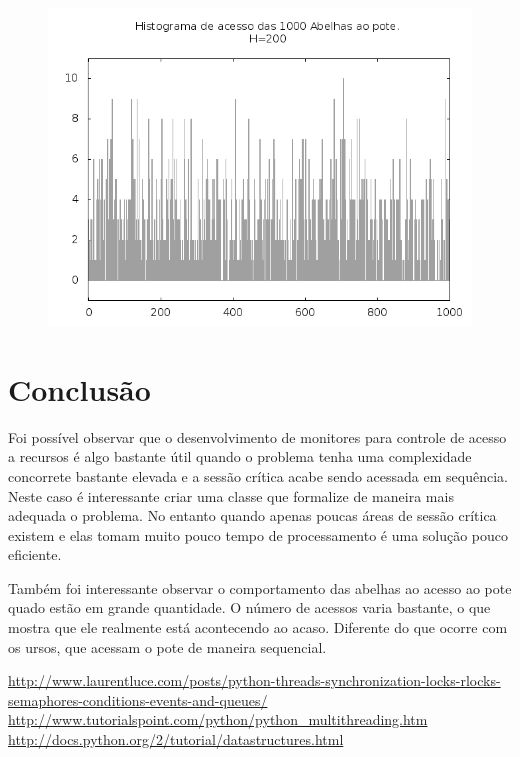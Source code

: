 \documentclass[12pt,a4paper]{article}
\begin{document}
\begin{figure}[!htb]
\centering
\includegraphics[width=0.7\paperwidth]{./graficos/histograma_1000_1_200_1000_10.png}
\label{Rotulo}
\end{figure}

\clearpage
\section{Conclusão}

Foi possível observar que o desenvolvimento de monitores para controle de acesso a recursos é algo bastante útil quando o problema tenha uma complexidade concorrete bastante elevada e a sessão crítica acabe sendo acessada em sequência. Neste caso é interessante criar uma classe que formalize de maneira mais adequada o problema. No entanto quando apenas poucas áreas de sessão crítica existem e elas tomam muito pouco tempo de processamento é uma solução pouco eficiente.

Também foi interessante observar o comportamento das abelhas ao acesso ao pote quado estão em grande quantidade. O número de acessos varia bastante, o que mostra que ele realmente está acontecendo ao acaso. Diferente do que ocorre com os ursos, que acessam o pote de maneira sequencial.

\begin{thebibliography}{99}
\url{http://www.laurentluce.com/posts/python-threads-synchronization-locks-rlocks-semaphores-conditions-events-and-queues/}
\url{http://www.tutorialspoint.com/python/python_multithreading.htm}
\url{http://docs.python.org/2/tutorial/datastructures.html}
\end{thebibliography}
\end{document}
